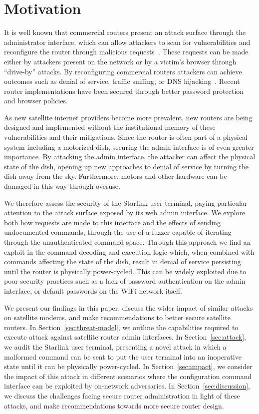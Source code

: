 \section{Motivation}\label{sec:motivation}

It is well known that commercial routers present an attack surface through the administrator interface, which can allow attackers to scan for vulnerabilities and reconfigure the router through malicious requests~\cite{niemietz2015owning}.
These requests can be made either by attackers present on the network or by a victim's browser through ``drive-by'' attacks.
By reconfiguring commercial routers attackers can achieve outcomes such as denial of service, traffic sniffing, or DNS hijacking~\cite{jeitner2022xdri}.
Recent router implementations have been secured through better password protection and browser policies.

As new satellite internet providers become more prevalent, new routers are being designed and implemented without the institutional memory of these vulnerabilities and their mitigations.
Since the router is often part of a physical system including a motorized dish, securing the admin interface is of even greater importance.
By attacking the admin interface, the attacker can affect the physical state of the dish, opening up new approaches to denial of service by turning the dish away from the sky.
Furthermore, motors and other hardware can be damaged in this way through overuse.

We therefore assess the security of the Starlink user terminal, paying particular attention to the attack surface exposed by its web admin interface.
We explore both how requests are made to this interface and the effects of sending undocumented commands, through the use of a fuzzer capable of iterating through the unauthenticated command space.
Through this approach we find an exploit in the command decoding and execution logic which, when combined with commands affecting the state of the dish, result in denial of service persisting until the router is physically power-cycled.
This can be widely exploited due to poor security practices such as a lack of password authentication on the admin interface, or default passwords on the WiFi network itself.

We present our findings in this paper, discuss the wider impact of similar attacks on satellite modems, and make recommendations to better secure satellite routers.
In Section~\ref{sec:threat-model}, we outline the capabilities required to execute attack against satellite router admin interfaces.
In Section~\ref{sec:attack}, we audit the Starlink user terminal, presenting a novel attack in which a malformed command can be sent to put the user terminal into an inoperative state until it can be physically power-cycled.
In Section~\ref{sec:impact}, we consider the impact of this attack in different scenarios where the configuration command interface can be exploited by on-network adversaries.
In Section~\ref{sec:discussion}, we discuss the challenges facing secure router administration in light of these attacks, and make recommendations towards more secure router design.

